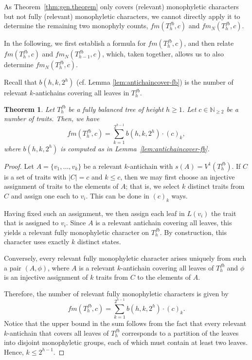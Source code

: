 \documentclass{amsart}
\newtheorem{theorem}{Theorem}
\theoremstyle{definition}
\begin{document}
As Theorem~\ref{thm:gen.theorem} only covers (relevant) monophyletic characters but not fully (relevant) monophyletic characters, we cannot directly apply it to determine the remaining two monophyly counts, $fm(T_h^{fb},c)$ and $fm_N(T_h^{fb},c)$.

In the following, we first establish a formula for $fm(T_{h}^{fb},c)$, and then relate $fm(T_{h}^{fb},c)$ and $fm_N(T_{h-1}^{fb},c)$, which, taken together, allows us to also determine $fm_N(T_{h}^{fb},c)$.

\medskip
Recall that $b(h,k,2^h)$ (cf. Lemma \ref{lem:antichaincover-fb}) is the number of relevant $k$-antichains covering all leaves in $T^{fb}_h$. 

\begin{theorem}\label{thm:fully-balanced-fully-relevant}
    Let $T_h^{fb}$ be a fully balanced tree of height $h \geq 1$. Let $c \in \mathbb{N}_{\geq 2}$ be a number of traits. Then, we have
    \[ fm(T_h^{fb},c) =  \sum\limits_{k=1}^{2^{h-1}} b(h,k,2^h) \cdot (c)_k,\]
    where $b(h,k,2^h)$ is computed as in Lemma~\ref{lem:antichaincover-fb}.  
\end{theorem}

\begin{proof}
Let $A = \{v_1, \ldots, v_k\}$ be a relevant $k$-antichain with $s(A) = V^1(T^{fb}_h)$. If $C$ is a set of traits with $|C|=c$ and $k \leq c$, then we may first choose an injective assignment of traits to the elements of $A$; that is, we select $k$ distinct traits from $C$ and assign one each to $v_i$. This can be done in $(c)_k$ ways.

Having fixed such an assignment, we then assign each leaf in $L(v_i)$ the trait that is assigned to $v_i$. Since $A$ is a relevant antichain covering all leaves, this yields a relevant fully monophyletic character on $T^{fb}_h$. By construction, this character uses exactly $k$ distinct states. 

Conversely, every relevant fully monophyletic character arises uniquely from such a pair $(A,\phi)$, where $A$ is a relevant $k$-antichain covering all leaves of $T^{fb}_h$ and $\phi$ is an injective assignment of $k$ traits from $C$ to the elements of $A$.

Therefore, the number of relevant fully monophyletic characters is given by
\[ fm(T_h^{fb},c) = \sum\limits_{k=1}^{2^{h-1}} b(h,k,2^h) \cdot (c)_k.\]
Notice that the upper bound in the sum follows from the fact that every relevant $k$-antichain that covers all leaves of $T^{fb}_h$ corresponds to a partition of the leaves into disjoint monophyletic groups, each of which must contain at least two leaves. Hence, $k \leq 2^{h-1}$.
\end{proof}
\end{document}
